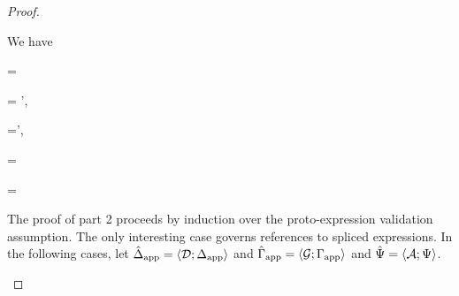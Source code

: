 \begin{proof}
\begin{byCases}
\item[\text{(\ref{rule:expandsU-tsmap})}] We have 
\begin{pfsteps}
  \item \ue= 
  \item \uA = \uA',  
  \item \Psi=\Psi',  
  \item {} 
  \item {} 
  \item \decodeCondE{\ecand}{\ce} 
  \item {} 
  \item \emptyset \cap \Delta = \emptyset {} 
  \item {\emptyset} \cap \domof{\Gamma} = \emptyset {} 
  \item {}  
  \item {} 
\end{pfsteps}
\resetpfcounter
\end{byCases}

The proof of part 2 proceeds by induction over the proto-expression validation assumption. The only interesting case governs references to spliced expressions. In the following cases, let $\hat{\Delta}_\text{app}=\langle \mathcal{D}; \Delta_\text{app} \rangle$ and $\hat{\Gamma}_\text{app}=\langle \mathcal{G}; \Gamma_\text{app} \rangle$ and $\hat{\Psi} = \langle \mathcal{A}; \Psi \rangle$.
\begin{byCases}


\end{byCases}
\end{proof}
